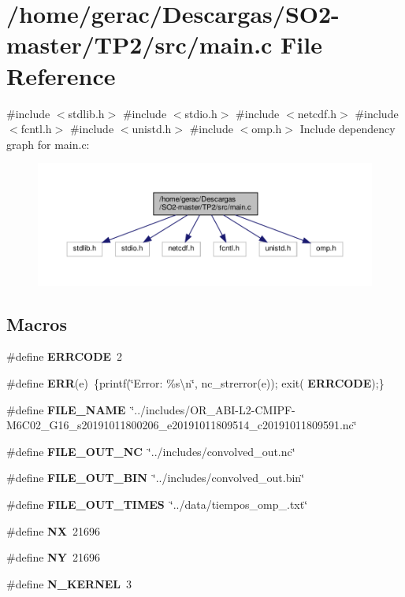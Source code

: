 \section{/home/gerac/\+Descargas/\+S\+O2-\/master/\+T\+P2/src/main.c File Reference}
\label{main_8c}
{\ttfamily \#include $<$stdlib.\+h$>$}\newline
{\ttfamily \#include $<$stdio.\+h$>$}\newline
{\ttfamily \#include $<$netcdf.\+h$>$}\newline
{\ttfamily \#include $<$fcntl.\+h$>$}\newline
{\ttfamily \#include $<$unistd.\+h$>$}\newline
{\ttfamily \#include $<$omp.\+h$>$}\newline
Include dependency graph for main.\+c\+:
\nopagebreak
\begin{figure}[H]
\begin{center}
\leavevmode
\includegraphics[width=350pt]{main_8c__incl}
\end{center}
\end{figure}
\subsection*{Macros}
\begin{DoxyCompactItemize}
\item 
\#define \textbf{ E\+R\+R\+C\+O\+DE}~2
\item 
\#define \textbf{ E\+RR}(e)~\{printf(\char`\"{}Error\+: \%s\textbackslash{}n\char`\"{}, nc\+\_\+strerror(e)); exit(\textbf{ E\+R\+R\+C\+O\+DE});\}
\item 
\#define \textbf{ F\+I\+L\+E\+\_\+\+N\+A\+ME}~\char`\"{}../includes/O\+R\+\_\+\+A\+BI-\/L2-\/C\+M\+I\+PF-\/M6\+C02\+\_\+\+G16\+\_\+s20191011800206\+\_\+e20191011809514\+\_\+c20191011809591.\+nc\char`\"{}
\item 
\#define \textbf{ F\+I\+L\+E\+\_\+\+O\+U\+T\+\_\+\+NC}~\char`\"{}../includes/convolved\+\_\+out.\+nc\char`\"{}
\item 
\#define \textbf{ F\+I\+L\+E\+\_\+\+O\+U\+T\+\_\+\+B\+IN}~\char`\"{}../includes/convolved\+\_\+out.\+bin\char`\"{}
\item 
\#define \textbf{ F\+I\+L\+E\+\_\+\+O\+U\+T\+\_\+\+T\+I\+M\+ES}~\char`\"{}../data/tiempos\+\_\+omp\+\_.\+txt\char`\"{}
\item 
\#define \textbf{ NX}~21696
\item 
\#define \textbf{ NY}~21696
\item 
\#define \textbf{ N\+\_\+\+K\+E\+R\+N\+EL}~3
\end{DoxyCompactItemize}

